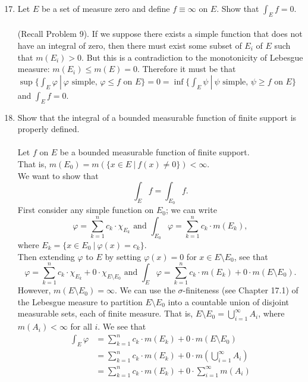 \begin{enumerate}
	\setcounter{enumi}{16}
    \item Let $E$ be a set of measure zero and define $f\equiv\infty$ on $E$. Show that $\int_Ef=0$.\\
    \\(Recall Problem 9).
    If we suppose there exists a simple function that does not have an integral of zero, then there must exist some subset of $E_i$ of $E$ such that $m(E_i)>0$. 
    But this is a contradiction to the monotonicity of Lebesgue measure: $m(E_i)\le m(E)=0$.
    Therefore it must be that $\sup\biggl\{\int_E\varphi\ |\ \varphi\text{ simple, }\varphi\le f\text{ on }E\biggr\}=0=\inf\biggl\{\int_E\psi\ |\ \psi\text{ simple, }\psi\ge f\text{ on }E\biggr\}$ and $\int_Ef=0$.
    \item Show that the integral of a bounded measurable function of finite support is properly defined.\\
    \\Let $f$ on $E$ be a bounded measurable function of finite support. 
    \\That is, $m(E_0)=m(\{x\in E\ |\ f(x)\neq0\})<\infty$.
    \\We want to show that
    \[
        \int_Ef=\int_{E_0}f.
    \]
    First consider any simple function on $E_0$;
    we can write
    \[
        \varphi=\sum_{k=1}^nc_k\cdot \chi_{E_k}\text{ and }\int_{E_0}\varphi=\sum_{k=1}^n c_k\cdot m(E_k),
    \]
    where $E_k=\{x\in E_0\ |\ \varphi(x)=c_k\}$.
    \\Then extending $\varphi$ to $E$ by setting $\varphi(x)=0$ for $x\in E\setminus E_0$, see that
    \[
        \varphi=\sum_{k=1}^nc_k\cdot \chi_{E_k}+0\cdot\chi_{E\setminus E_0}\text{ and }\int_{E}\varphi=\sum_{k=1}^n c_k\cdot m(E_k) + 0\cdot m(E\setminus E_0). 
    \]
    However, $m(E\setminus E_0)=\infty$.
    We can use the $\sigma$-finiteness (see Chapter 17.1) of the Lebesgue measure to partition $E\setminus E_0$ into a countable union of disjoint measurable sets, each of finite measure.
    That is, $E\setminus E_0=\bigcup_{i=1}^\infty A_i$, where $m(A_i)<\infty$ for all $i$.
    We see that
    \begin{align*}
        \int_{E}\varphi&=\sum_{k=1}^n c_k\cdot m(E_k) + 0\cdot m(E\setminus E_0)\\
        &=\sum_{k=1}^n c_k\cdot m(E_k) + 0\cdot m(\bigcup_{i=1}^\infty A_i)\\
        &=\sum_{k=1}^n c_k\cdot m(E_k) + 0\cdot \sum_{i=1}^\infty m(A_i)\\

\end{align*}
\end{enumerate}

